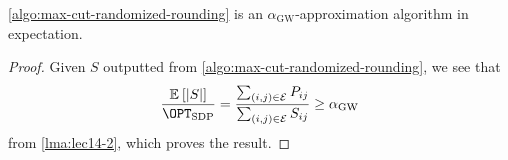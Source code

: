 \begin{theorem}\label{thm:max-cut}
	\autoref{algo:max-cut-randomized-rounding} is an \(\alpha _\mathrm{GW}\)-approximation algorithm in expectation.
\end{theorem}
\begin{proof}
	Given \(S\) outputted from \autoref{algo:max-cut-randomized-rounding}, we see that
	\[
		\frac{\mathbb{E}_{}\left[\left\vert S \right\vert \right] }{\OPT_{\mathrm{SDP} }} = \frac{\sum_{(i, j)\in \mathcal{\MakeUppercase{e}} } P_{ij} }{\sum_{(i, j)\in \mathcal{\MakeUppercase{e}} } S_{ij} } \geq \alpha _{\mathrm{GW} }
	\]
	from \autoref{lma:lec14-2}, which proves the result.
\end{proof}